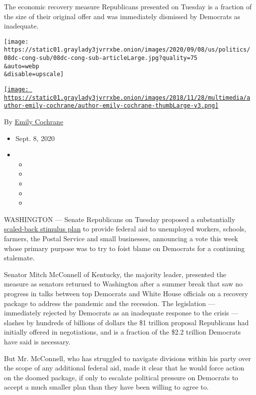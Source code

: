 The economic recovery measure Republicans presented on Tuesday is a
fraction of the size of their original offer and was immediately
dismissed by Democrats as inadequate.

\texttt{[image: https://static01.graylady3jvrrxbe.onion/images/2020/09/08/us/politics/08dc-cong-sub/08dc-cong-sub-articleLarge.jpg?quality=75\\\&auto=webp\\\&disable=upscale]}

\href{https://www.nytimes3xbfgragh.onion/by/emily-cochrane}{\texttt{[image: https://static01.graylady3jvrrxbe.onion/images/2018/11/28/multimedia/author-emily-cochrane/author-emily-cochrane-thumbLarge-v3.png]}}

By \href{https://www.nytimes3xbfgragh.onion/by/emily-cochrane}{Emily
Cochrane}

\begin{itemize}
\item
  Sept. 8, 2020
\item
  \begin{itemize}
  \item
  \item
  \item
  \item
  \item
  \end{itemize}
\end{itemize}

WASHINGTON --- Senate Republicans on Tuesday proposed a substantially
\href{https://www.nytimes3xbfgragh.onion/2020/08/18/us/politics/republicans-coronavirus-stimulus-bill.html}{scaled-back
stimulus plan} to provide federal aid to unemployed workers, schools,
farmers, the Postal Service and small businesses, announcing a vote this
week whose primary purpose was to try to foist blame on Democrats for a
continuing stalemate.

Senator Mitch McConnell of Kentucky, the majority leader, presented the
measure as senators returned to Washington after a summer break that saw
no progress in talks between top Democrats and White House officials on
a recovery package to address the pandemic and the recession. The
legislation --- immediately rejected by Democrats as an inadequate
response to the crisis --- slashes by hundreds of billions of dollars
the \$1 trillion proposal Republicans had initially offered in
negotiations, and is a fraction of the \$2.2 trillion Democrats have
said is necessary.

But Mr. McConnell, who has struggled to navigate divisions within his
party over the scope of any additional federal aid, made it clear that
he would force action on the doomed package, if only to escalate
political pressure on Democrats to accept a much smaller plan than they
have been willing to agree to.

